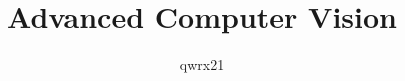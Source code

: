 \documentclass{article}
\author{qwrx21}
\title{Advanced Computer Vision}
\begin{document}
\maketitle
\pagebreak
\section{}
\subsection{}

\subsection{}

\subsection{}

\subsection{}


\pagebreak
\section{}
\subsection{}

\subsection{}

\subsection{}


\pagebreak
\section{}
\subsection{}

\subsection{}

\end{document}
